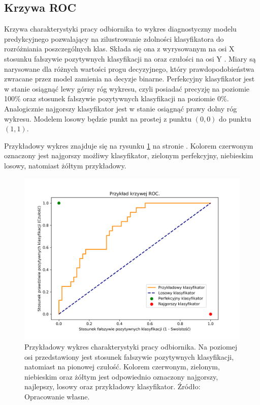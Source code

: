 \documentclass[inzynierska]{pwr_wmat_praca_dyplomowa}
\theoremstyle{plain}
\numberwithin{theorem}{chapter}
\theoremstyle{definition}
\numberwithin{theorem}{chapter}
\begin{document}
\subsection{Krzywa ROC}
\label{ROC}

Krzywa charakterystyki pracy odbiornika to wykres diagnostyczny modelu predykcyjnego pozwalający na zilustrowanie zdolności klasyfikatora do rozróżniania poszczególnych klas. Składa się ona z wyrysowanym na osi X stosunku fałszywie pozytywnych klasyfikacji na oraz czułości na osi Y \cite{evaluation_metrics}. Miary są narysowane dla różnych wartości progu decyzyjnego, który prawdopodobieństwa zwracane przez model zamienia na decyzje binarne. Perfekcyjny klasyfikator jest w stanie osiągnąć lewy górny róg wykresu, czyli posiadać precyzję na poziomie 100\% oraz stosunek fałszywie pozytywnych klasyfikacji na poziomie 0\%. Analogicznie najgorszy klasyfikator jest w stanie osiągnąć prawy dolny róg wykresu. Modelem losowy będzie punkt na prostej z punktu $(0,0)$ do punktu $(1,1)$. 

Przykładowy wykres znajduje się na rysunku \ref{fig:roc_example} na stronie \pageref{fig:roc_example}. Kolorem czerwonym oznaczony jest najgorszy możliwy klasyfikator, zielonym perfekcyjny, niebieskim losowy, natomiast żółtym przykładowy.

\begin{figure}[h]
	\includegraphics[width=\linewidth]{images/roc_example.png}
	\caption{Przykładowy wykres charakterystyki pracy odbiornika. Na poziomej osi przedstawiony jest stosunek fałszywie pozytywnych klasyfikacji, natomiast na pionowej czułość. Kolorem czerwonym, zielonym, niebieskim oraz żółtym jest odpowiednio oznaczony najgorszy, najlepszy, losowy oraz przykładowy klasyfikator. Źródło: Opracowanie własne.}
	\label{fig:roc_example}
\end{figure}
\end{document}
